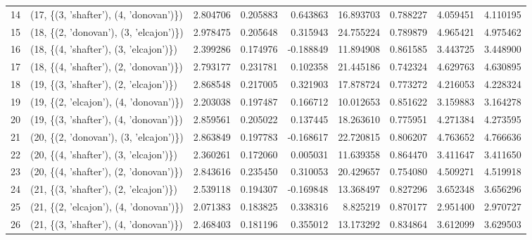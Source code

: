 \begin{tabular}{llrrrrrrr}
14 &  (17, \{(3, 'shafter'), (4, 'donovan')\}) &  2.804706 &   0.205883 &  0.643863 &  16.893703 &  0.788227 &   4.059451 &  4.110195 \\
15 &  (18, \{(2, 'donovan'), (3, 'elcajon')\}) &  2.978475 &   0.205648 &  0.315943 &  24.755224 &  0.789879 &   4.965421 &  4.975462 \\
16 &  (18, \{(4, 'shafter'), (3, 'elcajon')\}) &  2.399286 &   0.174976 & -0.188849 &  11.894908 &  0.861585 &   3.443725 &  3.448900 \\
17 &  (18, \{(4, 'shafter'), (2, 'donovan')\}) &  2.793177 &   0.231781 &  0.102358 &  21.445186 &  0.742324 &   4.629763 &  4.630895 \\
18 &  (19, \{(3, 'shafter'), (2, 'elcajon')\}) &  2.868548 &   0.217005 &  0.321903 &  17.878724 &  0.773272 &   4.216053 &  4.228324 \\
19 &  (19, \{(2, 'elcajon'), (4, 'donovan')\}) &  2.203038 &   0.197487 &  0.166712 &  10.012653 &  0.851622 &   3.159883 &  3.164278 \\
20 &  (19, \{(3, 'shafter'), (4, 'donovan')\}) &  2.859561 &   0.205022 &  0.137445 &  18.263610 &  0.775951 &   4.271384 &  4.273595 \\
21 &  (20, \{(2, 'donovan'), (3, 'elcajon')\}) &  2.863849 &   0.197783 & -0.168617 &  22.720815 &  0.806207 &   4.763652 &  4.766636 \\
22 &  (20, \{(4, 'shafter'), (3, 'elcajon')\}) &  2.360261 &   0.172060 &  0.005031 &  11.639358 &  0.864470 &   3.411647 &  3.411650 \\
23 &  (20, \{(4, 'shafter'), (2, 'donovan')\}) &  2.843616 &   0.235450 &  0.310053 &  20.429657 &  0.754080 &   4.509271 &  4.519918 \\
24 &  (21, \{(3, 'shafter'), (2, 'elcajon')\}) &  2.539118 &   0.194307 & -0.169848 &  13.368497 &  0.827296 &   3.652348 &  3.656296 \\
25 &  (21, \{(2, 'elcajon'), (4, 'donovan')\}) &  2.071383 &   0.183825 &  0.338316 &   8.825219 &  0.870177 &   2.951400 &  2.970727 \\
26 &  (21, \{(3, 'shafter'), (4, 'donovan')\}) &  2.468403 &   0.181196 &  0.355012 &  13.173292 &  0.834864 &   3.612099 &  3.629503 \\
\bottomrule
\end{tabular}
